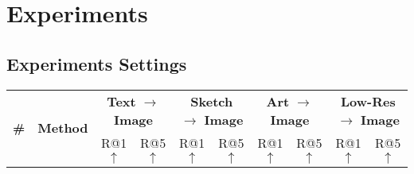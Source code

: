 \section{Experiments}

\subsection{Experiments Settings}

\newcommand{\pub}[1]{\color{red}{\tiny{#1}}}
\newcommand{\Frst}[1]{{\textbf{#1}}}
\newcommand{\Scnd}[1]{{\underline{#1}}}
\begin{table*}[htp]
\centering
\footnotesize
\renewcommand{\arraystretch}{1.05}  %
\setlength{\tabcolsep}{2.75mm}        %
{
{
\begin{tabular}{c|c|cc|cc|cc|cc}
    \toprule[1.5pt]
    \multirow{2}{*}{\textbf{\#}} & \multirow{2}{*}{\textbf{Method}} & \multicolumn{2}{c|}{\textbf{Text} \textbf{$\rightarrow$} \textbf{Image}} & \multicolumn{2}{c|}{\textbf{Sketch} \textbf{$\rightarrow$} \textbf{Image}} & \multicolumn{2}{c|}{\textbf{Art} \textbf{$\rightarrow$} \textbf{Image}} & \multicolumn{2}{c}{\textbf{Low-Res} \textbf{$\rightarrow$} \textbf{Image}} \\ 
    
    \cmidrule(rl){3-4}\cmidrule(rl){5-6}\cmidrule(rl){7-8}\cmidrule(rl){9-10}
    & & {R@1$\uparrow$} & {R@5$\uparrow$} & {R@1$\uparrow$} & {R@5$\uparrow$} & {R@1$\uparrow$} & {R@5$\uparrow$} & {R@1$\uparrow$} & {R@5$\uparrow$} \\


\end{tabular}}}
\end{table*}
